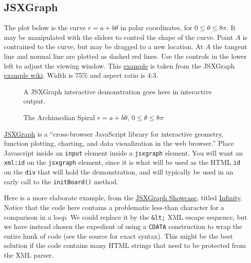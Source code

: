 \documentclass[10pt,]{article}
\theoremstyle{plain}
\theoremstyle{definition}
\theoremstyle{definition}
\theoremstyle{definition}
\theoremstyle{definition}
\theoremstyle{definition}
\theoremstyle{definition}
\numberwithin{equation}{section}
\begin{document}
\subsection[{JSXGraph}]{JSXGraph}\label{subsection-35}
\hypertarget{p-485}{}%
The plot below is the curve \(r=a+b\theta\) in polar coordinates, for \(0\leq\theta\leq 8\pi\).  It may be manipulated with the sliders to control the shape of the curve.  Point \(A\) is contrained to the curve, but may be dragged to a new location. At \(A\) the tangent line and normal line are plotted as dashed red lines.  Use the controls in the lower left to adjust the viewing window.  This \href{http://jsxgraph.uni-bayreuth.de/wiki/index.php/Archimedean_spiral}{example} is taken from the JSXGraph \href{http://jsxgraph.uni-bayreuth.de/wiki/index.php/Category:Examples}{example wiki}.  Width is 75\% and aspect ratio is 4:3.%
\begin{figure}
\centering
{}\par\smallskip\centerline{A JSXGraph interactive demonstration goes here in interactive output.}\smallskip
\caption{The Archimedian Spiral \(r = a + b\theta\), \(0\leq\theta\leq 8\pi\)\label{figure-21}}
\end{figure}
\hypertarget{p-486}{}%
\href{http://jsxgraph.uni-bayreuth.de/wp/index.html}{JSXGraph} is a ``cross-browser JavaScript library for interactive geometry, function plotting, charting, and data visualization in the web browser.''  Place Javascript inside an \lstinline?input? element inside a \lstinline?jsxgraph? element.  You will want an \lstinline?xml:id? on the \lstinline?jsxgraph? element, since it is what will be used as the HTML \lstinline?id? on the \lstinline?div? that will hold the demonstration, and will typically be used in an early call to the \lstinline?initBoard()? method.%
\par
\hypertarget{p-487}{}%
Here is a more elaborate example, from the \href{http://jsxgraph.uni-bayreuth.de/showcase/}{JSXGraph Showcase}, titled \href{http://jsxgraph.uni-bayreuth.de/showcase/infinity.html}{Infinity}.  Notice that the code here contains a problematic less-than character for a comparison in a loop.  We could replace it by the \lstinline?&lt;? XML escape sequence, but we have instead chosen the expedient of using a \lstinline?CDATA? construction to wrap the entire hunk of code (see the source for exact syntax).  This might be the best solution if the code contains many HTML strings that need to be protected from the XML parser.%
\par
\end{document}
